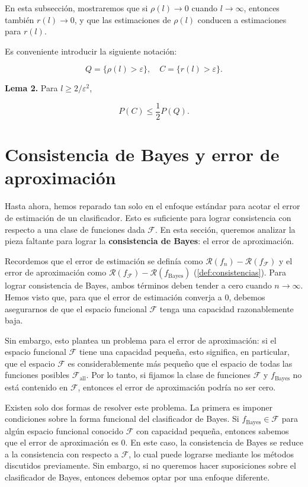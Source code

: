 \documentclass{article}
\begin{document}
En esta subsección, mostraremos que si \( \rho(l) \to 0 \) cuando \( l \to \infty \), entonces también \( r(l) \to 0 \), 
y que las estimaciones de \( \rho(l) \) conducen a estimaciones para \( r(l) \).

Es conveniente introducir la siguiente notación:

\[
Q = \{ \rho(l) > \varepsilon \}, \quad C = \{ r(l) > \varepsilon \}.
\]

\textbf{Lema 2.} Para \( l \geq 2 / \varepsilon^2 \),

\[
P(C) \leq \frac{1}{2} P(Q).
\]





\section{Consistencia de Bayes y error de aproximación}

Hasta ahora, hemos reparado tan solo en el enfoque estándar para acotar el error de estimación 
de un clasificador. Esto es suficiente para lograr consistencia con respecto a una clase de funciones 
dada \(\mathcal{F}\). En esta sección, queremos analizar la pieza faltante para lograr la 
\textbf{consistencia de Bayes}: el error de aproximación.\newline

Recordemos que el error de estimación se definía como \(\mathcal{R}(f_n) - \mathcal{R}(f_{\mathcal{F}})\) 
y el error de aproximación como \(\mathcal{R}(f_{\mathcal{F}}) - \mathcal{R}(f_{\text{Bayes}})\) 
(\ref{def:consistencias}). Para lograr consistencia de Bayes, ambos términos deben tender a cero cuando 
\(n \to \infty\). Hemos visto que, para que el error de estimación converja a \(0\), debemos 
asegurarnos de que el espacio funcional \(\mathcal{F}\) tenga una capacidad razonablemente baja.\newline

Sin embargo, esto plantea un problema para el error de aproximación: si el espacio funcional 
\(\mathcal{F}\) tiene una capacidad pequeña, esto significa, en particular, que el espacio 
\(\mathcal{F}\) es considerablemente más pequeño que el espacio de todas las funciones posibles 
\(\mathcal{F}_{\text{all}}\). Por lo tanto, si fijamos la clase de funciones \(\mathcal{F}\) y 
\(f_{\text{Bayes}}\) no está contenido en \(\mathcal{F}\), entonces el 
error de aproximación podría no ser cero.\newline

Existen solo dos formas de resolver este problema. La primera es imponer condiciones sobre la 
forma funcional del clasificador de Bayes. Si \(f_{\text{Bayes}} \in \mathcal{F}\) para algún 
espacio funcional conocido \(\mathcal{F}\) con capacidad pequeña, entonces sabemos que el error 
de aproximación es \(0\). En este caso, la consistencia de Bayes se reduce a la consistencia con 
respecto a \(\mathcal{F}\), lo cual puede lograrse mediante los métodos discutidos previamente. 
Sin embargo, si no queremos hacer suposiciones sobre el clasificador de Bayes, entonces 
debemos optar por una enfoque diferente.\newline
\end{document}
